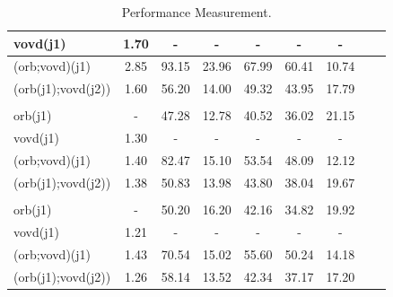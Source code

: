 \begin{table}[hbt]
\begin{tabularx}{\linewidth}{@{}l*{7}{C}c@{}}
		vovd(j1)           & 1.70          & -              & -                 & -                     & -                      & -               \\ \hline
		(orb;vovd)(j1)     & 2.85          & 93.15          & 23.96             & 67.99                 & 60.41                  & 10.74           \\ \hline
		(orb(j1);vovd(j2)) & 1.60          & 56.20          & 14.00             & 49.32                 & 43.95                  & 17.79           \\ \hline
		                                                                                                                                \\
		\hline
		orb(j1)            & -             & 47.28          & 12.78             & 40.52                 & 36.02                  & 21.15           \\ \hline
		vovd(j1)           & 1.30          & -              & -                 & -                     & -                      & -               \\ \hline
		(orb;vovd)(j1)     & 1.40          & 82.47          & 15.10             & 53.54                 & 48.09                  & 12.12           \\ \hline
		(orb(j1);vovd(j2)) & 1.38          & 50.83          & 13.98             & 43.80                 & 38.04                  & 19.67           \\ \hline
		                                                                                                                                \\
		\hline
		orb(j1)            & -             & 50.20          & 16.20             & 42.16                 & 34.82                  & 19.92           \\ \hline
		vovd(j1)           & 1.21          & -              & -                 & -                     & -                      & -               \\ \hline
		(orb;vovd)(j1)     & 1.43          & 70.54          & 15.02             & 55.60                 & 50.24                  & 14.18           \\ \hline
		(orb(j1);vovd(j2)) & 1.26          & 58.14          & 13.52             & 42.34                 & 37.17                  & 17.20           \\ \hline
		\bottomrule
	\end{tabularx}
	\caption{\label{tab:Performance-Measurement2}Performance Measurement.}
\end{table}







\clearpage
\thispagestyle{empty}